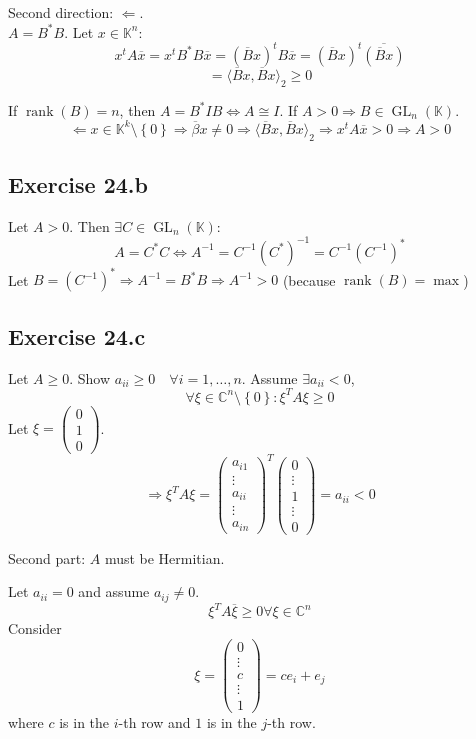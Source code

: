 \documentclass[a4paper]{article}
\theoremstyle{definition}
\newcommand\set[1]{\left\{#1\right\}}
\DeclareMathOperator\rank{rank}
\begin{document}
Second direction: $\Leftarrow$. \\
$A = B^* B$. Let $x \in \mathbb K^n$:
\[ x^t A \overline{x} = x^t B^* B \overline{x} = (\overline{B}x)^t B \overline{x} = (\overline{B} x)^t \overline{(\overline{B} x)} \]
\[ = \langle\overline{B}x, \overline{B}x\rangle_2 \geq 0 \]

If $\rank(B) = n$, then $A = B^* I B \Leftrightarrow A \cong I$.
If $A > 0 \Rightarrow B \in \operatorname{GL}_n(\mathbb K)$.
\[
  \Leftarrow x \in \mathbb K^k \setminus \set{0}
  \Rightarrow \overline{\beta} x \neq 0
  \Rightarrow \langle \overline{B}x, \overline{B}x\rangle_2
  \Rightarrow x^t A \overline{x} > 0
  \Rightarrow A > 0
\]

\subsection{Exercise 24.b}
%
Let $A > 0$. Then $\exists C \in \operatorname{GL}_n(\mathbb K)$:
\[ A = C^* C \Leftrightarrow A^{-1} = C^{-1} (C^*)^{-1} = C^{-1} (C^{-1})^* \]
Let $B = (C^{-1})^* \Rightarrow A^{-1} = B^* B \Rightarrow A^{-1} > 0$ (because $\rank(B) = \max$)

\subsection{Exercise 24.c}
%
Let $A \geq 0$. Show $a_{ii} \geq 0 \quad \forall i = 1, \ldots, n$.
Assume $\exists a_{ii} < 0$,
\[ \forall \xi \in \mathbb C^{n} \setminus \set{0}: \xi^T A \xi \geq 0\]
Let $\xi = \begin{pmatrix} 0 \\ 1 \\ 0 \end{pmatrix}$.
\[
  \Rightarrow
  \xi^T A \xi = \begin{pmatrix} a_{i1} \\ \vdots \\ a_{ii} \\ \vdots \\ a_{in} \end{pmatrix}^T
  \begin{pmatrix} 0 \\ \vdots \\ 1 \\ \vdots \\ 0 \end{pmatrix} = a_{ii} < 0
\]

Second part: $A$ must be Hermitian.

Let $a_{ii} = 0$ and assume $a_{ij} \neq 0$.
\[ \xi^T A \overline{\xi} \geq 0 \forall \xi \in \mathbb C^n \]
Consider
\[ \xi = \begin{pmatrix} 0 \\ \vdots \\ c \\ \vdots \\ 1 \end{pmatrix} = c e_i + e_j \]
where $c$ is in the $i$-th row and $1$ is in the $j$-th row.
\end{document}

